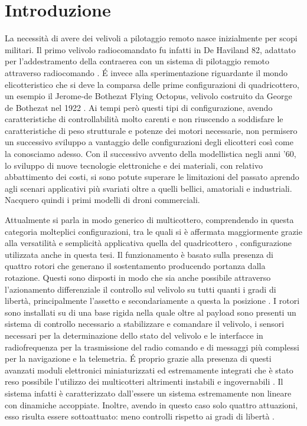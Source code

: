 \chapter{Introduzione}
La necessità di avere dei velivoli a pilotaggio remoto nasce inizialmente per scopi militari. Il primo velivolo radiocomandato fu infatti in De Haviland 82, adattato per l'addestramento della contraerea con un sistema di pilotaggio remoto attraverso radiocomando \cite{histoDrone}. \'E invece alla sperimentazione riguardante il mondo elicotteristico che si deve la comparsa delle prime configurazioni di quadricottero, un esempio il Jerome-de Bothezat Flying Octopus, velivolo costruito da George de Bothezat nel 1922 \cite{Young}. Ai tempi però questi tipi di configurazione, avendo caratteristiche di controllabilità molto carenti e non riuscendo a soddisfare le caratteristiche di peso strutturale e potenze dei motori necessarie, non permisero un successivo sviluppo a vantaggio delle configurazioni degli elicotteri così come la conosciamo adesso. Con il successivo avvento della modellistica negli anni '60, lo sviluppo di nuove tecnologie elettroniche e dei materiali, con relativo abbattimento dei costi, si sono potute superare le limitazioni del passato aprendo agli scenari applicativi più svariati oltre a quelli bellici, amatoriali e industriali. Nacquero quindi i primi modelli di droni commerciali.

Attualmente si parla in modo generico di multicottero, comprendendo in questa categoria molteplici configurazioni, tra le quali si è affermata maggiormente grazie alla versatilità e semplicità applicativa quella del quadricottero \cite{multi2015}, configurazione utilizzata anche in questa tesi. Il funzionamento è basato sulla presenza di quattro rotori che generano il sostentamento producendo portanza dalla rotazione. Questi sono disposti in modo che sia anche possibile attraverso l'azionamento differenziale il controllo sul velivolo su tutti quanti i gradi di libertà, principalmente l'assetto e secondariamente a questa la posizione \cite{multi2015}. I rotori sono installati su di una base rigida nella quale oltre al payload sono presenti un sistema di controllo necessario a stabilizzare e comandare il velivolo, i sensori necessari per la determinazione dello stato del velivolo e le interfacce in radiofrequenza per la trasmissione del radio comando e di messaggi più complessi per la navigazione e la telemetria. \'E proprio grazie alla presenza di questi avanzati moduli elettronici miniaturizzati ed estremamente integrati che è stato reso possibile l'utilizzo dei multicotteri altrimenti instabili e ingovernabili \cite{multi2015}. Il sistema infatti è caratterizzato dall'essere un sistema estremamente non lineare con dinamiche accoppiate. Inoltre, avendo in questo caso solo quattro attuazioni, esso risulta essere sottoattuato: meno controlli rispetto ai gradi di libertà \cite{nonlinear2008}.

